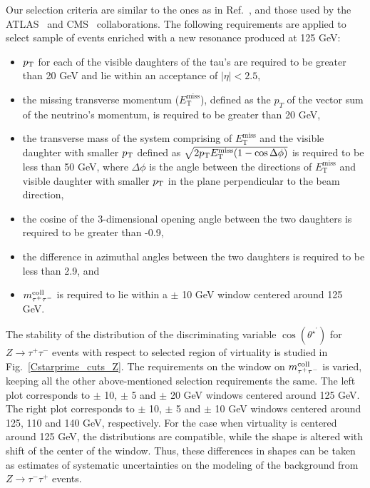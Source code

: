 \documentclass[12pt]{article}
\begin{document}
Our selection criteria are similar to the ones as in Ref.~\cite{Rainwater:1998kj, Plehn:1999xi}, 
and those used by the ATLAS~\cite{ATLAS_HCP} and CMS~\cite{CMS_HCP} collaborations.
The following requirements are applied to select sample of events enriched with a new resonance produced at 125 GeV:
\begin{itemize}
\item $p_{\rm{T}}$ for each of the visible daughters of the tau's are  required to be greater than 20 GeV and lie within an acceptance of $|\eta|<2.5$,
\item the missing transverse momentum ($E_{\mathrm{T}}^{\mathrm{miss}}$), 
defined as the $p_T$ of the vector sum of the neutrino's momentum, is required to be greater than  20 GeV,
\item the transverse mass of the system comprising of $E_{\mathrm{T}}^{\mathrm{miss}}$ and the visible daughter with smaller $p_{\rm{T}}$ 
defined as $\sqrt{2p_{\rm{T}}E_{\mathrm{T}}^{\mathrm{miss}}(1-\cos\Delta\phi)}$ is required to be less than 50 GeV, 
where $\Delta\phi$ is the angle between the directions of $E_{\mathrm{T}}^{\mathrm{miss}}$ and visible daughter 
with smaller $p_{\rm{T}}$ in the plane perpendicular to the beam direction,
\item the cosine of the 3-dimensional opening angle between the two  daughters is required to be greater than -0.9,
\item the difference in azimuthal angles between the two daughters is required to be less than 2.9, and
\item $m^{\rm{coll}}_{\tau^+\tau^-}$ is required to lie within a $\pm$ 10 GeV window centered around 125 GeV.
\end{itemize}


The stability of the distribution of the discriminating variable $\cos(\theta^{\star^\prime})$ for $Z\to\tau^+\tau^-$ events 
with respect to selected region of virtuality is studied in Fig.~\ref{Cstarprime_cuts_Z}.
The requirements on the window on  $m^{\rm{coll}}_{\tau^+\tau^-}$ is varied, keeping all the other above-mentioned selection requirements the same.
The left plot corresponds to $\pm$ 10, $\pm$ 5 and $\pm$ 20 GeV windows centered around 125 GeV. 
The right plot corresponds to $\pm$ 10, $\pm$ 5 and $\pm$ 10 GeV windows centered around 125, 110 and 140 GeV, respectively.
For the case when virtuality is centered around 125 GeV, the distributions are compatible, while the shape is altered with shift of the center of the window.
Thus, these differences in shapes can be taken as estimates of systematic uncertainties on the modeling of the background from $Z\to\tau^-\tau^+$ events.
\end{document}
